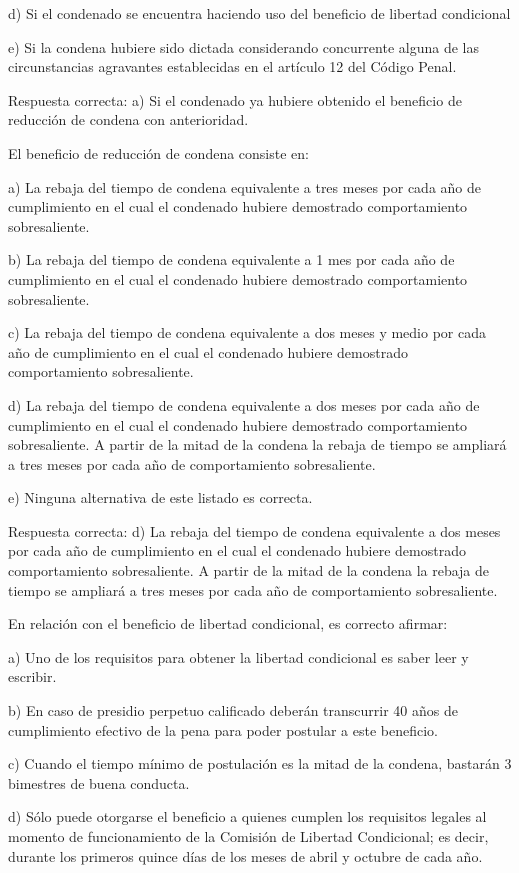\documentclass[letterpaper, 11pt]{article}
\begin{document}
d) Si el condenado se encuentra haciendo uso del beneficio de libertad condicional

e) Si la condena hubiere sido dictada considerando concurrente alguna de las
circunstancias agravantes establecidas en el artículo 12 del Código Penal.

Respuesta correcta:
a) Si el condenado ya hubiere obtenido el beneficio de reducción
de condena con anterioridad.


El beneficio de reducción de condena consiste en:

a) La rebaja del tiempo de condena equivalente a tres meses por cada año de cumplimiento
en el cual el condenado hubiere demostrado comportamiento sobresaliente.

b) La rebaja del tiempo de condena equivalente a 1 mes por cada año de cumplimiento en
el cual el condenado hubiere demostrado comportamiento sobresaliente.

c) La rebaja del tiempo de condena equivalente a dos meses y medio por cada año de
cumplimiento en el cual el condenado hubiere demostrado comportamiento sobresaliente.

d) La rebaja del tiempo de condena equivalente a dos meses por cada año de cumplimiento
en el cual el condenado hubiere demostrado comportamiento sobresaliente. A partir de la
mitad de la condena la rebaja de tiempo se ampliará a tres meses por cada año de
comportamiento sobresaliente.

e) Ninguna alternativa de este listado es correcta.

Respuesta correcta:
d) La rebaja del tiempo de condena equivalente a dos meses por
cada año de cumplimiento en el cual el condenado hubiere demostrado
comportamiento sobresaliente. A partir de la mitad de la condena la rebaja de tiempo
se ampliará a tres meses por cada año de comportamiento sobresaliente.


En relación con el beneficio de libertad condicional, es correcto afirmar:

a) Uno de los requisitos para obtener la libertad condicional es saber leer y escribir.

b) En caso de presidio perpetuo calificado deberán transcurrir 40 años de cumplimiento
efectivo de la pena para poder postular a este beneficio.

c) Cuando el tiempo mínimo de postulación es la mitad de la condena, bastarán 3 bimestres
de buena conducta.

d) Sólo puede otorgarse el beneficio a quienes cumplen los requisitos legales al momento
de funcionamiento de la Comisión de Libertad Condicional; es decir, durante los primeros
quince días de los meses de abril y octubre de cada año.
\end{document}
